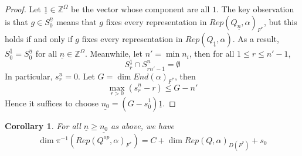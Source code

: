 \documentclass[12pt]{amsart}
\theoremstyle{plain}
\newtheorem{cor}[thm]{Corollary}
\theoremstyle{definition}
\theoremstyle{remark}
\begin{document}
\begin{proof}
\selectfont
Let $\underline{1}\in\mathbb Z^{\Omega}$ be the vector whose component are all $1$. The key observation is that $g\in S_0^{\underline{n}}$ means that $g$ fixes every representation in $Rep(Q_{\underline{n}},\alpha)_{F^*}$, but this holds if and only if $g$ fixes every representation in $Rep(Q_{\underline{1}},\alpha)$. As a result, $S_0^{\underline{1}}=S_0^{\underline{n}}$
for all $\underline{n}\in\mathbb Z^{\Omega}$. Meanwhile, let $n'=\min n_i$, then for all $1\leq r\leq n'-1$,
$$S_{r}^{\underline{1}}\cap S_{rn'-1}^{\underline{n}}=\emptyset$$
In particular, $s_{r}^{\underline{n}}=0$. Let $G=\dim End(\alpha)_{F^*}$, then 
$$\max_{r>0} (s_r^{\underline{n}}-r)\leq G-n'$$ 
Hence it suffices to choose $\underline{n_0}=(G-s_0^{\underline{1}})\underline{1}$.
\end{proof}
\begin{cor} For all $\underline{n}\geq\underline{n_0}$ as above, we have 
$$\dim\pi^{-1}(Rep(Q^{op},\alpha)_{F^*})=C+\dim Rep(Q,\alpha)_{D(F^*)}+s_0$$
\end{cor}
\end{document}
